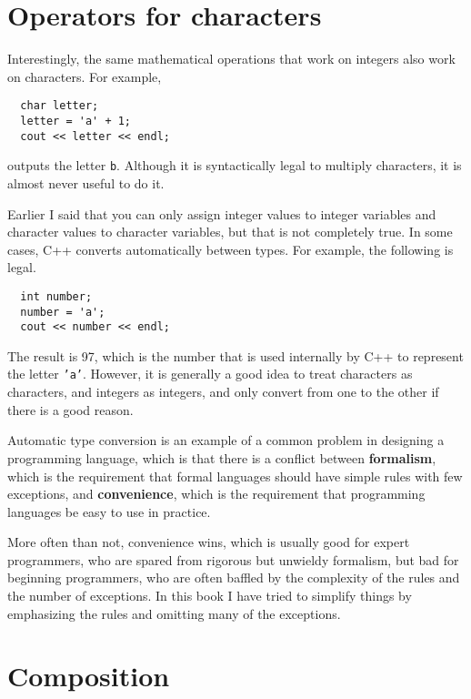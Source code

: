 \section{Operators for characters}

Interestingly, the same mathematical operations that work on
integers also work on characters.  For example,

\begin{lstlisting}
  char letter;
  letter = 'a' + 1;
  cout << letter << endl;
\end{lstlisting}
%
outputs the letter {\tt b}.  Although it is syntactically legal
to multiply characters, it is almost never useful to do it.

Earlier I said that you can only assign integer values to
integer variables and character values to character variables,
but that is not completely true.  In some cases, C++ converts
automatically between types.  For example, the following is
legal.

\begin{lstlisting}
  int number;
  number = 'a';
  cout << number << endl;
\end{lstlisting}
%
The result is 97, which is the number that is used internally
by C++ to represent the letter {\tt 'a'}.  However, it is
generally a good idea to treat characters as characters, and
integers as integers, and only convert from one to the other
if there is a good reason.

Automatic type conversion is an example of a common problem in designing a
programming language, which is that there is a conflict between {\bf
formalism}, which is the requirement that formal languages should have
simple rules with few exceptions, and {\bf convenience}, which is the
requirement that programming languages be easy to use in practice.

More often than not, convenience wins, which is usually good for
expert programmers, who are spared from rigorous but unwieldy
formalism, but bad for beginning programmers, who are often baffled
by the complexity of the rules and the number of exceptions.  In this
book I have tried to simplify things by emphasizing the rules and
omitting many of the exceptions.


\section{Composition}

